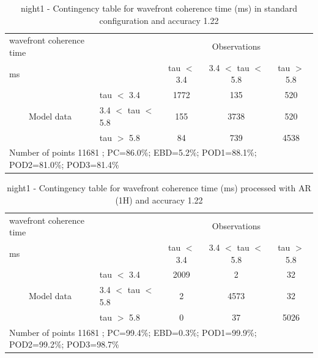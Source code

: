 \begin{table}[p!]
\begin{center}
\begin{tabular}{llccc}
\hline
{wavefront coherence time}                                       &                                                    & \multicolumn{3}{c}{Observations}                 \\
{ms}                                       &                             & tau $<$ 3.4   & 3.4 $<$ tau $<$ 5.8 & tau $>$ 5.8 \\
\hline
\multicolumn{1}{c}{\multirow{3}{*}{Model data}}  & tau $<$ 3.4             & 1772                & 135                       & 520              \\
                                                 & 3.4  $<$ tau $<$ 5.8 & 155                & 3738                       & 520              \\
                                                 & tau $>$ 5.8             & 84                & 739                       & 4538              \\
\hline
\multicolumn{5}{l}{ Number of points        11681 ; PC=86.0\%; EBD=5.2\%; POD1=88.1\%; POD2=81.0\%; POD3=81.4\%}
\end{tabular}
\end{center}
\caption{night1 - Contingency table for  wavefront coherence time (ms) in standard configuration and accuracy 1.22}
\label{tab:contingencytauBEF:night1}
\end{table}
\begin{table}[p!]
\begin{center}
\begin{tabular}{llccc}
\hline
{wavefront coherence time}                                       &                                                    & \multicolumn{3}{c}{Observations}                 \\
{ms}                                       &                             & tau $<$ 3.4   & 3.4 $<$ tau $<$ 5.8 & tau $>$ 5.8 \\
\hline
\multicolumn{1}{c}{\multirow{3}{*}{Model data}}  & tau $<$ 3.4             & 2009                & 2                       & 32              \\
                                                 & 3.4  $<$ tau $<$ 5.8 & 2                & 4573                       & 32              \\
                                                 & tau $>$ 5.8             & 0                & 37                       & 5026              \\
\hline
\multicolumn{5}{l}{ Number of points        11681 ; PC=99.4\%; EBD=0.3\%; POD1=99.9\%; POD2=99.2\%; POD3=98.7\%}
\end{tabular}
\end{center}
\caption{night1 - Contingency table for  wavefront coherence time (ms) processed with AR (1H) and accuracy 1.22}
\label{tab:contingencytauAFT:night1}
\end{table}
